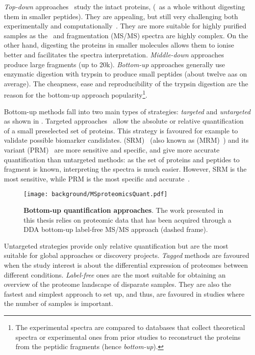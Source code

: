 \emph{Top-down} approaches~ study the intact proteins,
(\ie\ as a whole without digesting them in smaller peptides).
They are appealing, but still very challenging both
experimentally and computationally~.
They are more suitable for highly purified samples
as the \ms\ and fragmentation (\gls{MS/MS}) spectra are highly complex.
On the other hand,
digesting the proteins in smaller molecules allows them
to ionise better and facilitates the spectra interpretation.
\emph{Middle-down} approaches~ produce
large fragments (up to 20k).
\emph{Bottom-up} approaches generally use enzymatic digestion with trypsin
to produce small peptides (about twelve \glspl{aa} on average).
The cheapness, ease and reproducibility of the trypsin digestion
are the reason for the bottom-up approach popularity\footnote{%
The experimental spectra are compared to databases
that collect theoretical spectra or experimental ones from prior studies
to reconstruct the proteins from the peptidic fragments (hence \emph{bottom-up}).%
}.\mybr\

Bottom-up methods fall into two main types of strategies:
\emph{targeted} and \emph{untargeted} as shown in .
Targeted approaches~ allow
the absolute or relative quantification of a small preselected set of proteins.
This strategy is favoured for example to validate possible biomarker candidates.
 (\gls{SRM})~
(also known as  (\gls{MRM})~)
and its variant  (\gls{PRM})~
are more sensitive and specific, and give more accurate quantification
than untargeted methods:
as the set of proteins and peptides to fragment is known,
interpreting the spectra is much easier.
However, \gls{SRM} is the most sensitive,
while \gls{PRM} is the most specific and accurate~.\mybr\

\begin{figure}[!htbp]
    \texttt{[image: background/MSproteomicsQuant.pdf]}\centering
    \caption[Bottom-up quantification approaches]{\label{fig:msbottomupQuant}%
    \textbf{Bottom-up quantification approaches}.
    The work presented in this thesis relies on proteomic data
    that has been acquired through a \gls{DDA} bottom-up label-free
    \gls{MS/MS} approach (dashed frame).
    }
\end{figure}

Untargeted strategies provide only relative quantification
but are the most suitable for global approaches or discovery projects.
\emph{Tagged} methods are favoured
when the study interest is about the differential expression of proteomes between
different conditions.
\emph{Label-free} ones are the most suitable for obtaining an overview of
the proteome landscape of disparate samples.
They are also the fastest and simplest approach to set up,
and thus, are favoured in studies where the number of samples is important.\mybr\

